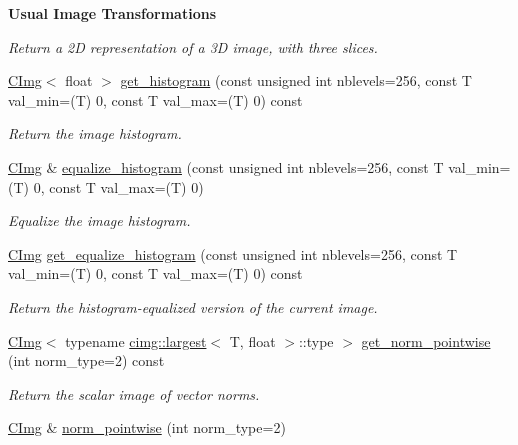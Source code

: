 \begin{Indent}{\bf Usual Image Transformations}
\begin{DoxyCompactItemize}
\begin{DoxyCompactList}\small\item\em Return a 2D representation of a 3D image, with three slices. \item\end{DoxyCompactList}\item 
\hyperlink{structcimg__library_1_1_c_img}{CImg}$<$ float $>$ \hyperlink{structcimg__library_1_1_c_img_a388cdc9ea14c5979ca244087647e344d}{get\_\-histogram} (const unsigned int nblevels=256, const T val\_\-min=(T) 0, const T val\_\-max=(T) 0) const 
\begin{DoxyCompactList}\small\item\em Return the image histogram. \item\end{DoxyCompactList}\item 
\hyperlink{structcimg__library_1_1_c_img}{CImg} \& \hyperlink{structcimg__library_1_1_c_img_a386c5bfabae28bf303b5aba88e73b974}{equalize\_\-histogram} (const unsigned int nblevels=256, const T val\_\-min=(T) 0, const T val\_\-max=(T) 0)
\begin{DoxyCompactList}\small\item\em Equalize the image histogram. \item\end{DoxyCompactList}\item 
\hyperlink{structcimg__library_1_1_c_img}{CImg} \hyperlink{structcimg__library_1_1_c_img_ad51813f525845badc730fafa4282f94a}{get\_\-equalize\_\-histogram} (const unsigned int nblevels=256, const T val\_\-min=(T) 0, const T val\_\-max=(T) 0) const 
\begin{DoxyCompactList}\small\item\em Return the histogram-\/equalized version of the current image. \item\end{DoxyCompactList}\item 
\hyperlink{structcimg__library_1_1_c_img}{CImg}$<$ typename \hyperlink{structcimg__library_1_1cimg_1_1largest}{cimg::largest}$<$ T, float $>$::type $>$ \hyperlink{structcimg__library_1_1_c_img_a68578c8d130fa1c00dee778855faa12d}{get\_\-norm\_\-pointwise} (int norm\_\-type=2) const 
\begin{DoxyCompactList}\small\item\em Return the scalar image of vector norms. \item\end{DoxyCompactList}\item 
\hyperlink{structcimg__library_1_1_c_img}{CImg} \& \hyperlink{structcimg__library_1_1_c_img_a2c7af7a94c6ada6645257c8cd0ffa791}{norm\_\-pointwise} (int norm\_\-type=2)

\end{DoxyCompactItemize}
\end{Indent}
